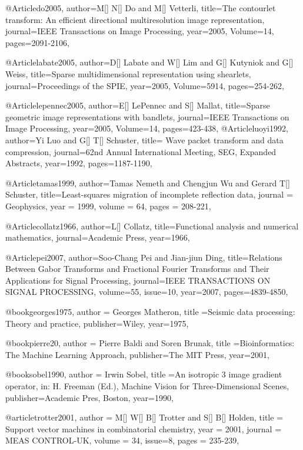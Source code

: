 @Article{do2005,
  author={M[] N[] Do and M[] Vetterli},
  title={The contourlet transform: An efficient directional multiresolution image representation},
  journal={IEEE Transactions on Image Processing},
  year=2005,
  Volume=14,
  pages={2091-2106},
}

@Article{labate2005,
  author={D[] Labate and W[] Lim and G[] Kutyniok and G[] Weiss},
  title={Sparse multidimensional representation using shearlets},
  journal={Proceedings of the SPIE},
  year=2005,
  Volume=5914,
  pages={254-262},
}

@Article{lepennec2005,
  author={E[] LePennec and S[] Mallat},
  title={Sparse geometric image representations with bandlets},
  journal={IEEE Transactions on Image Processing},
  year=2005,
  Volume=14,
  pages={423-438},
}
@Article{luoyi1992,
  author={Yi Luo and G[] T[] Schuster},
  title={	Wave packet transform and data compression},
  journal={62nd Annual International Meeting, SEG, Expanded Abstracts},
  year=1992,
  pages={1187-1190},
}

@Article{tamas1999,
  author={Tamas Nemeth and Chengjun Wu and Gerard T[] Schuster},
  title={Least-squares migration of incomplete reflection data},
  journal = 	 {Geophysics},
  year = 	 1999,
  volume =	 64,
  pages =	 {208-221},
}

@Article{collatz1966,
author={L[] Collatz},
title={Functional analysis and numerical mathematics},
journal={Academic Press},
year=1966,
}

@Article{pei2007,
author={Soo-Chang Pei and Jian-jiun Ding},
title={Relations Between Gabor Transforms and Fractional {F}ourier Transforms and Their Applications for Signal Processing},
journal={IEEE TRANSACTIONS ON SIGNAL PROCESSING},
volume=55,
issue=10,
year=2007,
pages={4839-4850},
}

@book{georges1975,
  author = {Georges Matheron},
  title ={Seismic data processing: Theory and practice},
  publisher={Wiley},
  year=1975,
}

@book{pierre20,
  author = {Pierre Baldi and Soren Brunak},
  title ={Bioinformatics: The Machine Learning Approach},
  publisher={The MIT Press},
  year=2001,
}


@book{sobel1990,
  author = {Irwin Sobel},
  title ={An isotropic 3 image gradient operator, in: H. Freeman (Ed.), Machine Vision for Three-Dimensional Scenes},
  publisher={Academic Pres, Boston},
  year=1990,
}


@article{trotter2001,
author = {M[] W[] B[] Trotter and S[] B[] Holden},
title = {Support vector machines in combinatorial chemistry},
year = {2001},
journal = {MEAS CONTROL-UK},
volume = {34},
issue=8,
pages = {235-239},
}

